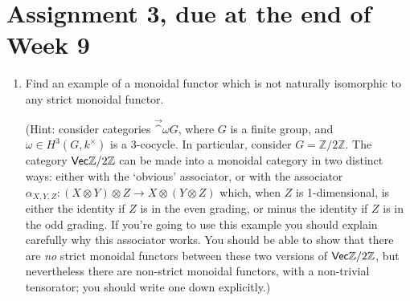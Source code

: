 \documentclass[12pt]{amsart}
\begin{document}
\section{Assignment 3, due at the end of Week 9}
\begin{enumerate}


\item Find an example of a monoidal functor which is not naturally isomorphic to any strict monoidal functor.

(Hint: consider categories $\Vec^\omega G$, where $G$ is a finite group, and $\omega \in H^3(G, k^\times)$ is a 3-cocycle. In particular, consider $G = \mathbb Z / 2 \mathbb Z$. The category $\Vec \mathbb Z / 2 \mathbb Z$ can be made into a monoidal category in two
distinct ways: either with the `obvious' associator, or with the associator $\alpha_{X, Y, Z} : (X \otimes Y) \otimes Z \to X \otimes (Y \otimes Z)$ which, when $Z$ is 1-dimensional, is either the identity if $Z$ is in the even grading, or minus the identity if $Z$ is in the odd grading. If you're going to use this example you should explain carefully why this associator works. You should be able to show that there are \emph{no} strict monoidal functors between these two versions of $\Vec \mathbb Z / 2 \mathbb Z$, but nevertheless there are non-strict monoidal functors, with a non-trivial tensorator; you should write one down explicitly.)


\end{enumerate}
\end{document}
